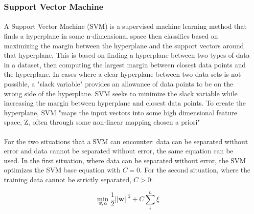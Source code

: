 \begin{comment}
			\paragraph*{}For this thesis, the counts from words in the Google Web1T corpus are used to smooth word counts in naive Bayes.  For example, the word "dog" appears 3,450,297 time in the Web1T corpus, so the count for "dog" is initialized to 3,450,297.  The denominator for a Google Web1T smooth naive Bayes instance is 1,024,908,267 based on total count weight of all tokens in the corpus.The specific details of the Google Web1T corpus are covered in a later section of this chapter.
\end{comment}
		\subsubsection{Support Vector Machine}
			\paragraph{}A Support Vector Machine (SVM) is a supervised machine learning method that finds a hyperplane in some n-dimensional space then classifies based on maximizing the margin between the hyperplane and the support vectors around that hyperplane.  This is based on finding a hyperplane between two types of data in a dataset, then computing the largest margin between closest data points and the hyperplane.  In cases where a clear hyperplane between two data sets is not possible, a "slack variable" provides an allowance of data points to be on the wrong side of the hyperplane. SVM seeks to minimize the slack variable while increasing the margin between hyperplane and closest data points. To create the hyperplane, SVM "maps the input vectors into some high dimensional feature space, Z, often through some non-linear mapping chosen a priori" \cite{vapnik_support-vector_1995}

			\paragraph{}For the two situations that a SVM can encounter: data can be separated without error and data cannot be separated without error, the same equation can be used.  In the first situation, where data can be separated without error, the SVM optimizes the SVM base equation with $C=0$.  For the second situation, where the training data cannot be strictly separated, $C > 0$:
			
			\begin{equation} \min_{w,\alpha}\frac{1}{2}\mathbf{||w||}^2 + C \sum_i^n{\xi} 
			\end{equation}
			
